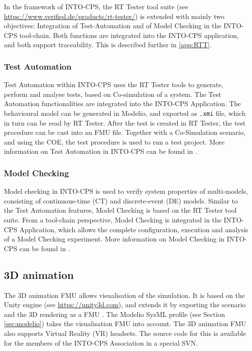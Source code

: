In the framework of INTO-CPS, the RT Tester tool suite (see \url{https://www.verified.de/products/rt-tester/}) is extended with mainly two objectives: Integration of Test-Automation and of Model Checking in the INTO-CPS tool-chain. Both functions are integrated into the INTO-CPS application, and both support traceability. This is described further in \autoref{app:RTT}.

\subsubsection{Test Automation}

Test Automation within INTO-CPS uses the RT Tester tools to generate, perform and analyse tests, based on Co-simulation of a system. The Test Automation functionalities are integrated into the INTO-CPS Application. The behavioural model can be generated in Modelio, and exported as \texttt{.xmi} file, which in turn can be read by RT Tester. After the test is created in RT Tester, the test procedure can be cast into an FMU file. Together with a Co-Simulation scenario, and using the COE, the test procedure is used to run a test project. More information on Test Automation in INTO-CPS can be found in \cite{INTOCPSD5.3b}.

\subsubsection{Model Checking}

Model checking in INTO-CPS is used to verify system properties of multi-models, consisting of continuous-time (CT) and discrete-event (DE) models. Similar to the Test Automation features, Model Checking is based on the RT Tester tool suite. From a tool-chain perspective, Model Checking is integrated in the INTO-CPS Application, which allows the complete configuration, execution and analysis of a Model Checking experiment. More information on Model Checking in INTO-CPS can be found in \cite{INTOCPSD5.3c}.


\subsection{3D animation}

The 3D animation FMU allows visualisation of the simulation. It is based on the Unity engine (see \url{https://unity3d.com}), and extends it by exporting the scenario and the 3D rendering as a FMU \cite{Foldager&17}. The Modelio SysML profile (see Section \ref{sec:modelio}) takes the visualisation FMU into account. The 3D animation FMU also supports Virtual Reality (VR) headsets. The source code for this is available for the members of the INTO-CPS Association in a special SVN.

